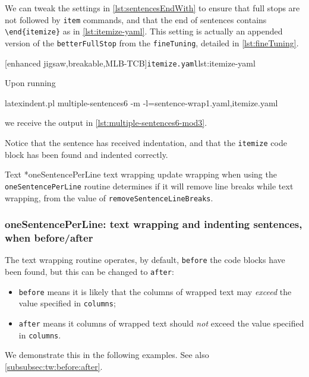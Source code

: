 \documentclass[10pt]{article}
\begin{document}
 \begin{example}
 We can tweak the settings in \vref{lst:sentencesEndWith} to ensure that full stops are
 not followed by \texttt{item} commands, and that the end of sentences contains
 \lstinline!\end{itemize}! as in \cref{lst:itemize-yaml}. This setting is actually an
 appended version of the \texttt{betterFullStop} from the \texttt{fineTuning}, detailed
 in \vref{lst:fineTuning}.    

 [enhanced jigsaw,breakable,MLB-TCB]{\texttt{itemize.yaml}}{lst:itemize-yaml}

 Upon running  

 \begin{commandshell}
latexindent.pl multiple-sentences6 -m -l=sentence-wrap1.yaml,itemize.yaml
\end{commandshell}

 we receive the output in \cref{lst:multiple-sentences6-mod3}.


 Notice that the sentence has received indentation, and that the \texttt{itemize} code
 block has been found and indented correctly.
 \end{example}

 Text *{oneSentencePerLine text wrapping update} wrapping when using
 the \texttt{oneSentencePerLine} routine determines if it will remove line breaks while
 text wrapping, from the value of \texttt{removeSentenceLineBreaks}.

\subsubsection{oneSentencePerLine: text wrapping and indenting sentences, when before/after}\label{subsubsec:ospl:before:after}
 The text wrapping routine operates, by default, \texttt{before} the
  code blocks have been found, but
 this can be changed to \texttt{after}:
 \begin{itemize}
  \item \texttt{before} means it is likely that the columns of wrapped text may \emph{exceed} the
        value specified in \texttt{columns};
  \item \texttt{after} means it columns of wrapped text should \emph{not} exceed the value
        specified in \texttt{columns}.
 \end{itemize}
 We demonstrate this in the following examples. See also
 \cref{subsubsec:tw:before:after}.
\end{document}
